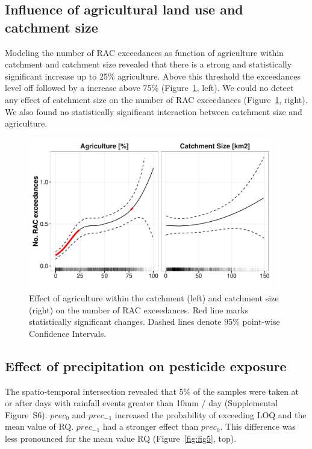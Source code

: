 \documentclass[journal=esthag,manuscript=article]{achemso}
\begin{document}
\subsection{Influence of agricultural land use and catchment size}
Modeling the number of RAC exceedances as function of agriculture within catchment and catchment size revealed that there is a strong and statistically significant increase up to 25\% agriculture.
Above this threshold the exceedances level off followed by a increase above 75\% (Figure~\ref{fig:fig4}, left).
We could no detect any effect of catchment size on the number of RAC exceedances (Figure~\ref{fig:fig4}, right).
We also found no statistically significant interaction between catchment size and agriculture.

\begin{figure}[ht]
  \includegraphics[width=0.95\textwidth]{figure4.pdf}
  \caption{Effect of agriculture within the catchment (left) and catchment size (right) on the number of RAC exceedances. Red line marks statistically significant changes. Dashed lines denote 95\% point-wise Confidence Intervals.
  }
  \label{fig:fig4}
\end{figure}


\subsection{Effect of precipitation on pesticide exposure}
The spatio-temporal intersection revealed that 5\% of the samples were taken at or after days with rainfall events greater than 10mm / day (Supplemental Figure~S6).
$prec_{0}$ and $prec_{-1}$ increased the probability of exceeding LOQ and the mean value of RQ.
$prec_{-1}$ had a stronger effect than $prec_{0}$. 
This difference was less pronounced for the mean value RQ (Figure~\ref{fig:fig5}, top).
\end{document}
